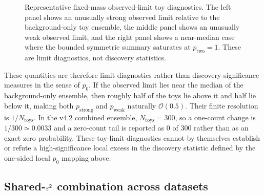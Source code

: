 \begin{figure}[H]
\centering
{}
\caption{Representative fixed-mass observed-limit toy diagnostics. The left panel
shows an unusually strong observed limit relative to the background-only toy
ensemble, the middle panel shows an unusually weak observed limit, and the right
panel shows a near-median case where the bounded symmetric summary saturates at
$p_{\mathrm{two}}=1$. These are limit diagnostics, not discovery
statistics.}
\label{fig:pvalue-tail-examples}
\end{figure}

These quantities are therefore limit diagnostics rather than discovery-significance
measures in the sense of $p_0$. If the observed limit lies near the median of the
background-only ensemble, then roughly half of the toys lie above it and half lie
below it, making both $p_{\mathrm{strong}}$ and $p_{\mathrm{weak}}$ naturally
$\mathcal{O}(0.5)$. Their finite resolution is $1/N_{\mathrm{toys}}$. In the v4.2
combined ensemble, $N_{\mathrm{toys}}=300$, so a one-count change is
$1/300\simeq0.0033$ and a zero-count tail is reported as 0 of 300 rather than as an
exact zero probability. These toy-limit diagnostics cannot by themselves establish
or refute a high-significance local excess in the discovery statistic defined by the
one-sided local $p_0$ mapping above.

\subsection{Shared-\texorpdfstring{$\varepsilon^2$}{epsilon2} combination across datasets}
\label{sec:combination}

